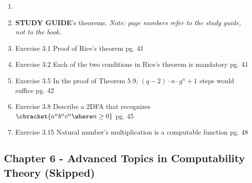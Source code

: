 \documentclass[12pt]{article} %
\newcommand{\theoremitem}[3]{\item #1 \quad #2 \dotfill #3}
\newenvironment{theoremlist} {
    \begin{enumerate}[nosep,leftmargin=*,label={}]
} {
    \end{enumerate}
}
\begin{document}
\begin{theoremlist}
    \item[]
    \item[]
    \textbf{STUDY GUIDE}'s theorems. \textit{Note: page numbers refer to the study guide, not to the book.}
    \theoremitem{Exercise 3.1}
    {Proof of Rice's theorem}
    {pg. 41}
    \theoremitem{Exercise 3.2}
    {Each of the two conditions in Rice's theorem is mandatory}
    {pg. 41}
    \theoremitem{Exercise 3.5}
    {In the proof of Theorem 5.9, $(q-2)\cdot n\cdot g^n+1$ steps would suffice}
    {pg. 42}
    \theoremitem{Exercise 3.8}
    {Describe a 2DFA that recognizes $\cbracket{a^n b^n c^n \where n \geq 0}$}
    {pg. 45}
    \theoremitem{Exercise 3.15}
    {Natural number's multiplication is a computable function}
    {pg. 48}
\end{theoremlist}




\subsection{Chapter 6 - Advanced Topics in Computability Theory (Skipped)}
\end{document}
